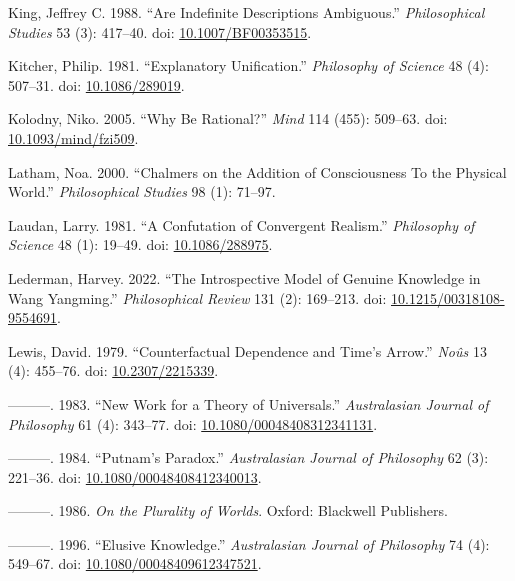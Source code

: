 \documentclass[
  11pt,
  letterpaper,
  DIV=11,
  numbers=noendperiod,
  twoside]{scrartcl}
\newlength{\cslhangindent}
\newenvironment{CSLReferences}[2] %
 {\begin{list}{}{%
  \setlength{\itemindent}{0pt}
  \setlength{\leftmargin}{0pt}
  \setlength{\parsep}{0pt}
  \ifodd #1
   \setlength{\leftmargin}{\cslhangindent}
   \setlength{\itemindent}{-1\cslhangindent}
  \fi
  \setlength{\itemsep}{#2\baselineskip}}}
 {\end{list}}
\begin{document}
\begin{CSLReferences}{1}{0}
King, Jeffrey C. 1988. {``Are Indefinite Descriptions Ambiguous.''}
\emph{Philosophical Studies} 53 (3): 417--40. doi:
\href{https://doi.org/10.1007/BF00353515}{10.1007/BF00353515}.

Kitcher, Philip. 1981. {``Explanatory Unification.''} \emph{Philosophy
of Science} 48 (4): 507--31. doi:
\href{https://doi.org/10.1086/289019}{10.1086/289019}.

Kolodny, Niko. 2005. {``Why Be Rational?''} \emph{Mind} 114 (455):
509--63. doi:
\href{https://doi.org/10.1093/mind/fzi509}{10.1093/mind/fzi509}.

Latham, Noa. 2000. {``Chalmers on the Addition of Consciousness To the
Physical World.''} \emph{Philosophical Studies} 98 (1): 71--97.

Laudan, Larry. 1981. {``A Confutation of Convergent Realism.''}
\emph{Philosophy of Science} 48 (1): 19--49. doi:
\href{https://doi.org/10.1086/288975}{10.1086/288975}.

Lederman, Harvey. 2022. {``The Introspective Model of Genuine Knowledge
in Wang Yangming.''} \emph{Philosophical Review} 131 (2): 169--213. doi:
\href{https://doi.org/10.1215/00318108-9554691}{10.1215/00318108-9554691}.

Lewis, David. 1979. {``Counterfactual Dependence and Time's Arrow.''}
\emph{Noûs} 13 (4): 455--76. doi:
\href{https://doi.org/10.2307/2215339}{10.2307/2215339}.

---------. 1983. {``New Work for a Theory of Universals.''}
\emph{Australasian Journal of Philosophy} 61 (4): 343--77. doi:
\href{https://doi.org/10.1080/00048408312341131}{10.1080/00048408312341131}.

---------. 1984. {``Putnam's Paradox.''} \emph{Australasian Journal of
Philosophy} 62 (3): 221--36. doi:
\href{https://doi.org/10.1080/00048408412340013}{10.1080/00048408412340013}.

---------. 1986. \emph{On the Plurality of Worlds}. Oxford: Blackwell
Publishers.

---------. 1996. {``Elusive Knowledge.''} \emph{Australasian Journal of
Philosophy} 74 (4): 549--67. doi:
\href{https://doi.org/10.1080/00048409612347521}{10.1080/00048409612347521}.


\end{CSLReferences}
\end{document}
